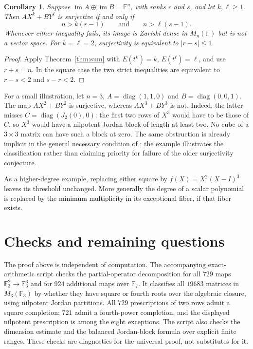 \documentclass[11pt]{article}
\newtheorem{corollary}[theorem]{Corollary}
\theoremstyle{remark}\newtheorem{remark}[theorem]{Remark}
\newcommand{\F}{\mathbb F}
\newcommand{\im}{\operatorname{im}}
\begin{document}
\begin{corollary}\label{cor:powers}
Suppose $\im A\oplus\im B=\F^n$, with ranks $r$ and $s$, and let $k,\ell\ge1$. Then $AX^k+BY^\ell$ is surjective if and only if
\[
 n>k(r-1)\qquad\text{and}\qquad n>\ell(s-1).
\]
Whenever either inequality fails, its image is Zariski dense in $M_n(\F)$ but is not a vector space. For $k=\ell=2$, surjectivity is equivalent to $|r-s|\le1$.
\end{corollary}

\begin{proof}
Apply Theorem~\ref{thm:sum} with $E(t^k)=k$, $E(t^\ell)=\ell$, and use $r+s=n$. In the square case the two strict inequalities are equivalent to $r-s<2$ and $s-r<2$.
\end{proof}

For a small illustration, let $n=3$, $A=\operatorname{diag}(1,1,0)$ and $B=\operatorname{diag}(0,0,1)$. The map $AX^2+BY^2$ is surjective, whereas $AX^3+BY^3$ is not. Indeed, the latter misses $C=\operatorname{diag}(J_2(0),0)$: the first two rows of $X^3$ would have to be those of $C$, so $X^3$ would have a nilpotent Jordan block of length at least two. No cube of a $3\times3$ matrix can have such a block at zero. The same obstruction is already implicit in the general necessary condition of \cite{SS}; the example illustrates the classification rather than claiming priority for failure of the older surjectivity conjecture.

As a higher-degree example, replacing either square by $f(X)=X^2(X-I)^3$ leaves its threshold unchanged. More generally the degree of a scalar polynomial is replaced by the minimum multiplicity in its exceptional fiber, if that fiber exists.

\section{Checks and remaining questions}
The proof above is independent of computation. The accompanying exact-arithmetic script checks the partial-operator decomposition for all $729$ maps $\F_3^2\to\F_3^3$ and for $924$ additional maps over $\F_7$. It classifies all $19683$ matrices in $M_3(\F_3)$ by whether they have square or fourth roots over the algebraic closure, using nilpotent Jordan partitions. All $729$ prescriptions of two rows admit a square completion; $721$ admit a fourth-power completion, and the displayed nilpotent prescription is among the eight exceptions. The script also checks the dimension estimate and the balanced Jordan-block formula over explicit finite ranges. These checks are diagnostics for the universal proof, not substitutes for it.
\end{document}
